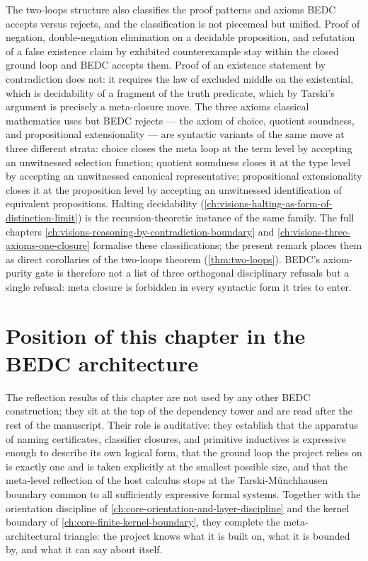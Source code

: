\begin{remark}
\label{rem:reasoning-and-axioms-as-meta-closure}
The two-loops structure also classifies the proof patterns and axioms BEDC accepts versus rejects, and the classification is not piecemeal but unified. Proof of negation, double-negation elimination on a decidable proposition, and refutation of a false existence claim by exhibited counterexample stay within the closed ground loop and BEDC accepts them. Proof of an existence statement by contradiction does not: it requires the law of excluded middle on the existential, which is decidability of a fragment of the truth predicate, which by Tarski's argument is precisely a meta-closure move. The three axioms classical mathematics uses but BEDC rejects --- the axiom of choice, quotient soundness, and propositional extensionality --- are syntactic variants of the same move at three different strata: choice closes the meta loop at the term level by accepting an unwitnessed selection function; quotient soundness closes it at the type level by accepting an unwitnessed canonical representative; propositional extensionality closes it at the proposition level by accepting an unwitnessed identification of equivalent propositions. Halting decidability (\autoref{ch:visions-halting-as-form-of-distinction-limit}) is the recursion-theoretic instance of the same family. The full chapters \autoref{ch:visions-reasoning-by-contradiction-boundary} and \autoref{ch:visions-three-axioms-one-closure} formalise these classifications; the present remark places them as direct corollaries of the two-loops theorem (\autoref{thm:two-loops}). BEDC's axiom-purity gate is therefore not a list of three orthogonal disciplinary refusals but a single refusal: meta closure is forbidden in every syntactic form it tries to enter.
\end{remark}

\section{Position of this chapter in the BEDC architecture}
\label{sec:reflection-position}

The reflection results of this chapter are not used by any other BEDC construction; they sit at the top of the dependency tower and are read after the rest of the manuscript. Their role is auditative: they establish that the apparatus of naming certificates, classifier closures, and primitive inductives is expressive enough to describe its own logical form, that the ground loop the project relies on is exactly one and is taken explicitly at the smallest possible size, and that the meta-level reflection of the host calculus stops at the Tarski-M\"unchhausen boundary common to all sufficiently expressive formal systems. Together with the orientation discipline of \autoref{ch:core-orientation-and-layer-discipline} and the kernel boundary of \autoref{ch:core-finite-kernel-boundary}, they complete the meta-architectural triangle: the project knows what it is built on, what it is bounded by, and what it can say about itself.

